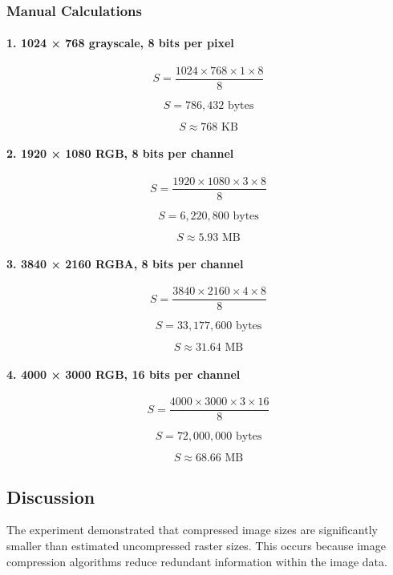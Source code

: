 \documentclass[12pt,a4paper]{article}
\begin{document}
\subsubsection{Manual Calculations}

\paragraph{1. 1024 × 768 grayscale, 8 bits per pixel}

\[
S = \frac{1024 \times 768 \times 1 \times 8}{8}
\]

\[
S = 786,432 \text{ bytes}
\]

\[
S \approx 768 \text{ KB}
\]

\paragraph{2. 1920 × 1080 RGB, 8 bits per channel}

\[
S = \frac{1920 \times 1080 \times 3 \times 8}{8}
\]

\[
S = 6,220,800 \text{ bytes}
\]

\[
S \approx 5.93 \text{ MB}
\]

\paragraph{3. 3840 × 2160 RGBA, 8 bits per channel}

\[
S = \frac{3840 \times 2160 \times 4 \times 8}{8}
\]

\[
S = 33,177,600 \text{ bytes}
\]

\[
S \approx 31.64 \text{ MB}
\]

\paragraph{4. 4000 × 3000 RGB, 16 bits per channel}

\[
S = \frac{4000 \times 3000 \times 3 \times 16}{8}
\]

\[
S = 72,000,000 \text{ bytes}
\]

\[
S \approx 68.66 \text{ MB}
\]

\subsection{Discussion}

The experiment demonstrated that compressed image sizes are significantly smaller than estimated uncompressed raster sizes. This occurs because image compression algorithms reduce redundant information within the image data.
\end{document}
